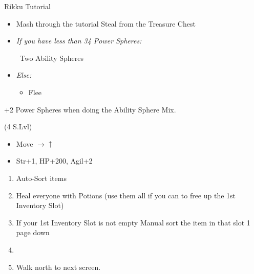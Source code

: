 \begin{battle}{Rikku Tutorial}
    \begin{itemize}
        \item Mash through the tutorial
        \rikkuf Steal from the Treasure Chest
        \item \textit{If you have less than 34 Power Spheres:}
        \begin{itemize}
            \rikkuf \od\ Two Ability Spheres
        \end{itemize}
        \item \textit{Else:}
        \begin{itemize}
            \rikkuf \od\ Two Potions
            \rikkuf Defend
            \item Flee
        \end{itemize}
    \end{itemize}
    +2 Power Spheres when doing the Ability Sphere Mix.
\end{battle}
\begin{spheregrid}
    \begin{itemize}
        \tidusf (4 S.Lvl)
        \begin{itemize}
            \item Move $\rightarrow\uparrow$
            \item Str+1, HP+200, Agil+2
        \end{itemize}
    \end{itemize}
\end{spheregrid}
\begin{enumerate}[resume]
    \item Auto-Sort items
    \item Heal everyone with Potions (use them all if you can to free up the 1st Inventory Slot)
    \item If your 1st Inventory Slot is not empty Manual sort the item in that slot 1 page down
    \item \formation{\tidus}{\wakka}{\auron}
    \item Walk north to next screen.
\end{enumerate}